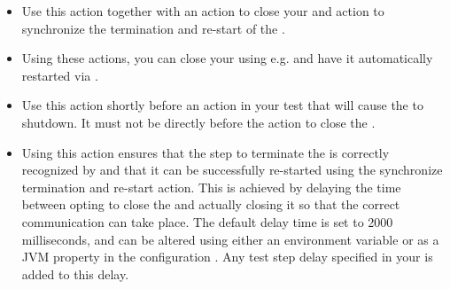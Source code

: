 

\begin{itemize}
\item Use this action together with an action to close your \gdaut{} and action to synchronize the termination and re-start of the \gdaut{}. 
\item Using these actions, you can close your \gdaut{} using e.g.  and have it automatically restarted via \app{}.
\item Use this action shortly before an action in your test that will cause the \gdaut{} to shutdown. It must not be directly before the action to close the \gdaut{}. 
\item Using this action ensures that the step to terminate the \gdaut{} is correctly recognized by \app{} and that it can be successfully re-started using the synchronize termination and re-start action. This is achieved by delaying the time between opting to close the \gdaut{} and actually closing it so that the correct communication can take place. The default delay time is set to 2000 milliseconds, and can be altered using either an environment variable  or as a JVM property in the \gdaut{} configuration  . Any test step delay specified in your \gdsuite{} is added to this delay.

\end{itemize}



